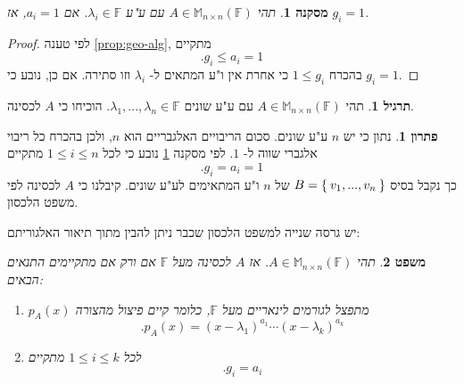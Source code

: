 \documentclass[12pt]{report}
\theoremstyle{plain}
\newtheorem{theorem}{משפט}[chapter]
\newtheorem{corollary}[theorem]{מסקנה}
\theoremstyle{definition}
\newtheorem{exercise}{תרגיל}[chapter]
\newtheorem*{solution}{פתרון}
\newcommand{\F}{\mathbb{F}}
\newcommand{\M}{\mathbb{M}}
\newcommand{\0}{\mathbf{0}}
\begin{document}
\begin{corollary}\label{cor:simple-eigenvalue}
תהי
$A\in\M_{n\times n}(\F)$
עם ע"ע
$\lambda_i\in\F$.
אם
$a_i=1$,
אז 
$g_i=1$.
\end{corollary}

\begin{proof}
לפי טענה
\ref{prop:geo-alg},
מתקיים
$$
.g_i\leq a_i=1
$$
בהכרח
$1\leq g_i$
כי אחרת אין ו"ע המתאים ל-
$\lambda_i$
וזו סתירה. אם כן, נובע כי
$g_i=1$.
\end{proof}

\begin{exercise}
תהי
$A\in\M_{n\times n}(\F)$
עם ע"ע שונים
$\lambda_1,...,\lambda_n\in\F$.
הוכיחו כי
$A$
לכסינה.
\end{exercise}

\begin{solution}
נתון כי יש 
$n$
ע"ע שונים. סכום הריבויים האלגבריים הוא
$n$,
ולכן בהכרח כל ריבוי אלגברי שווה ל-
$1$.
לפי מסקנה
\ref{cor:simple-eigenvalue}
נובע כי לכל
$1\leq i\leq n$
מתקיים
$$
.g_i=a_i=1
$$
כך נקבל בסיס 
$B=\Set{v_1,...,v_n}$
של 
$n$
ו"ע המתאימים לע"ע שונים. קיבלנו כי
$A$
לכסינה לפי משפט הלכסון.
\end{solution}

יש גרסה שנייה למשפט הלכסון שכבר ניתן להבין מתוך תיאור האלגוריתם:

\begin{theorem}\label{thm:diag2}
תהי
$A\in\M_{n\times n}(\F)$.
אז
$A$
לכסינה מעל
$\F$
אם ורק אם מתקיימים התנאים הבאים:
\begin{enumerate}[label=\alph*.]
\item 
$p_A(x)$
מתפצל לגורמים לינאריים מעל
$\F$, 
כלומר קיים פיצול מהצורה
$$
.p_A(x)=(x-\lambda_1)^{a_1}\cdots(x-\lambda_k)^{a_k}
$$


\item 
לכל
$1\leq i\leq k$
מתקיים
$$
.g_i=a_i
$$


\end{enumerate}
\end{theorem}
\end{document}
